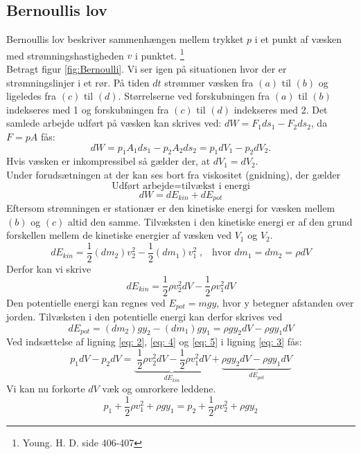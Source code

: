 \documentclass[a4paper, 11pt]{article}
\begin{document}
\subsection{Bernoullis lov}
Bernoullis lov beskriver sammenhængen mellem trykket \(p\) i et punkt af væsken med strømningshastigheden \(v\) i punktet. \footnote{Young. H. D. side 406-407}
\\
Betragt figur \ref{fig:Bernoulli}. Vi ser igen på situationen hvor der er strømningslinjer i et rør. På tiden \(dt\) strømmer væsken fra \((a)\) til \((b)\) 
og ligeledes fra \((c)\) til \((d)\). Størrelserne ved forskubningen fra \((a)\) til \((b)\) indekseres med 1 og  forskubningen fra \((c)\) til \((d)\) indekseres med 2.
Det samlede arbejde udført på væsken kan skrives ved: \(dW=F_1ds_1-F_2ds_2\), da \(F=pA\) fås:
\begin{equation}
    \label{eq: 2}
    dW=p_1A_1ds_1-p_2A_2ds_2=p_1dV_1-p_2dV_2.
\end{equation}
Hvis væsken er inkompressibel så gælder der, at \(dV_1=dV_2\).\\
Under forudsætningen at der kan ses bort fra viskositet (gnidning), der gælder
\[\text{Udført arbejde} = \text{tilvækst i energi}\]
\begin{equation}
    \label{eq: 3}
    dW=dE_{kin}+dE_{pot}
\end{equation}
Eftersom strømningen er stationær er den kinetiske energi for væsken mellem \((b)\) og \((c)\) altid den samme.
Tilvæksten i den kinetiske energi er af den grund forskellen mellem de kinetiske energier af væsken ved \(V_1\) og \(V_2\).
\[dE_{kin}=\frac{1}{2}(dm_2)v_2^2-\frac{1}{2}(dm_1)v_1^2\;,\;\;\; \text{hvor } dm_1=dm_2=\rho dV\]
Derfor kan vi skrive
\begin{equation}
    \label{eq: 4}
    dE_{kin}=\frac{1}{2}\rho v_2^2 dV-\frac{1}{2}\rho v_1^2 dV
\end{equation}
Den potentielle energi kan regnes ved \(E_{pot}=mgy\), hvor y betegner afstanden over jorden. Tilvæksten i den potentielle energi kan derfor skrives ved
\begin{equation}
    \label{eq: 5}
    dE_{pot}=(dm_2)gy_2-(dm_1)gy_1 = \rho g y_2 dV-\rho g y_1 dV
\end{equation}
Ved indsættelse af ligning \ref{eq: 2}, \ref{eq: 4} og \ref{eq: 5} i ligning \ref{eq: 3} fås:
\[p_1dV-p_2dV=\underbrace{\;\frac{1}{2}\rho v_2^2dV - \frac{1}{2} \rho v_1^2dV}_{dE_{kin}} + \underbrace{\rho g y_2 dV - \rho g y_1 dV}_{dE_{pot}}\]
Vi kan nu forkorte \(dV\) væk og omrorkere leddene.
\[p_1+\frac{1}{2} \rho v_1^2+\rho g y_1 = p_2+\frac{1}{2} \rho v_2^2+\rho gy_2\]
\end{document}
